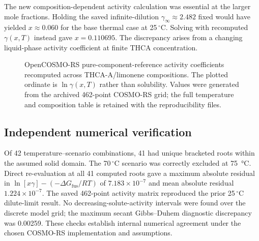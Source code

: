 \documentclass[10pt,a4paper,twocolumn]{article}
\begin{document}
The new composition-dependent activity calculation was essential at the larger mole fractions. Holding the saved infinite-dilution $\gamma_\infty\approx2.482$ fixed would have yielded $x\approx0.060$ for the base thermal case at 25\,$^\circ$C. Solving with recomputed $\gamma(x,T)$ instead gave $x=0.110695$. The discrepancy arises from a changing liquid-phase activity coefficient at finite THCA concentration.

\begin{figure}[t]
\centering
{}
\caption{OpenCOSMO-RS pure-component-reference activity coefficients recomputed across THCA-A/limonene compositions. The plotted ordinate is $\ln\gamma(x,T)$ rather than solubility. Values were generated from the archived 462-point COSMO-RS grid; the full temperature and composition table is retained with the reproducibility files.}
\label{fig:activity}
\end{figure}

\subsection{Independent numerical verification}
Of 42 temperature–scenario combinations, 41 had unique bracketed roots within the assumed solid domain. The 70\,$^\circ$C scenario was correctly excluded at \SI{75}{\celsius}. Direct re-evaluation at all 41 computed roots gave a maximum absolute residual in $\ln[x\gamma]-(-\Delta G_{\mathrm{fus}}/RT)$ of $7.183\times10^{-7}$ and mean absolute residual $1.224\times10^{-7}$. The saved 462-point activity matrix reproduced the prior 25\,$^\circ$C dilute-limit result. No decreasing-solute-activity intervals were found over the discrete model grid; the maximum secant Gibbs–Duhem diagnostic discrepancy was 0.00259. These checks establish internal numerical agreement under the chosen COSMO-RS implementation and assumptions.
\end{document}
